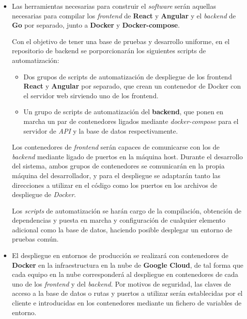 \documentclass[11pt, a4paper, titlepage]{article}
\begin{document}
\begin{itemize}
    \item Las herramientas necesarias para construir el \textit{software} serán aquellas necesarias para compilar los \textit{frontend} de \textbf{React} y \textbf{Angular} y el \textit{backend} de \textbf{Go} por separado, junto a \textbf{Docker} y \textbf{Docker-compose}. \newline
    
    Con el objetivo de tener una base de pruebas y desarrollo uniforme, en el repositorio de backend se porporcionarán los siguientes scripts de automatización:
    \begin{itemize}
        \item Dos grupos de scripts de automatización de despliegue de los frontend \textbf{React} y \textbf{Angular} por separado, que crean un contenedor de Docker con el servidor web sirviendo uno de los frontend.
        
        \item Un grupo de scripts de automatización del \textbf{backend}, que ponen en marcha un par de contenedores ligados mediante \textit{docker-compose} para el servidor de \textit{API} y la base de datos respectivamente.
    \end{itemize}
    
    Los contenedores de \textit{frontend} serán capaces de comunicarse con los de \textit{backend} mediante ligado de puertos en la máquina host. Durante el desarrollo del sistema, ambos grupos de contenedores se comunicarán en la propia máquina del desarrollador, y para el despliegue se adaptarán tanto las direcciones a utilizar en el código como los puertos en los archivos de despliegue de \textit{Docker}.
    
    Los \textit{scripts} de automatización se harán cargo de la compilación, obtención de dependencias y puesta en marcha y configuración de cualquier elemento adicional como la base de datos, haciendo posible desplegar un entorno de pruebas común.

    \item El despliegue en entornos de producción se realizará con contenedores de \textbf{Docker} en la infraestructura en la nube de \textbf{Google Cloud}, de tal forma que cada equipo en la nube corresponderá al despliegue en contenedores de cada uno de los \textit{frontend} y del \textit{backend}. Por motivos de seguridad, las claves de acceso a la base de datos o rutas y puertos a utilizar serán establecidas por el cliente e introducidas en los contenedores mediante un fichero de variables de entorno.
\end{itemize}
\end{document}
